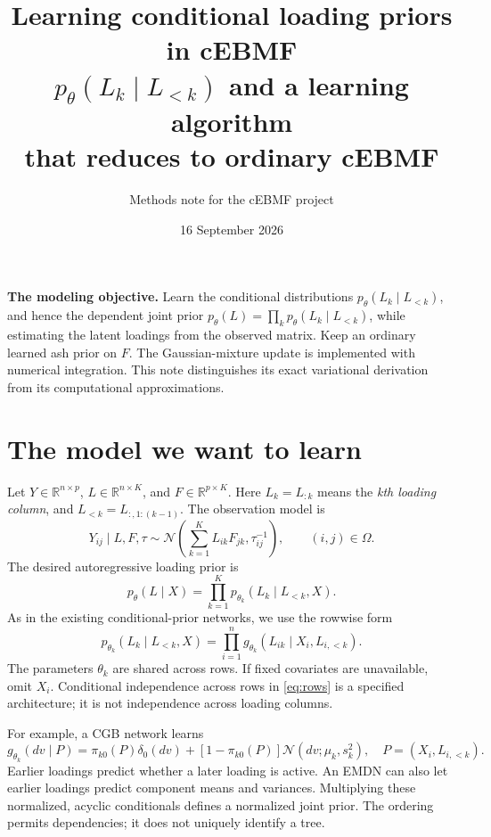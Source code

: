\documentclass[11pt,a4paper]{article}
\title{\textbf{Learning conditional loading priors in cEBMF}\\[7pt]
  \Large $p_\theta(L_k\mid L_{<k})$ and a learning algorithm\\
  that reduces to ordinary cEBMF}
\author{Methods note for the cEBMF project}
\date{16 September 2026}
\newcommand{\N}{\mathcal N}
\newcommand{\note}[1]{\par\smallskip\noindent\colorbox{blue!5}{\parbox{\dimexpr\linewidth-2\fboxsep\relax}{#1}}\par\smallskip}
\begin{document}
\maketitle
\thispagestyle{fancy}

\note{\textbf{The modeling objective.} Learn the conditional distributions
\(p_\theta(L_k\mid L_{<k})\), and hence the dependent joint prior
\(p_\theta(L)=\prod_kp_\theta(L_k\mid L_{<k})\), while estimating the latent
loadings from the observed matrix. Keep an ordinary learned ash prior on
\(F\). The Gaussian-mixture update is implemented with numerical integration.
This note distinguishes its exact variational derivation from its computational approximations.}

\section{The model we want to learn}
Let \(Y\in\mathbb R^{n\times p}\), \(L\in\mathbb R^{n\times K}\), and
\(F\in\mathbb R^{p\times K}\). Here \(L_k=L_{:k}\) means the \emph{kth
loading column}, and \(L_{<k}=L_{:,1:(k-1)}\). The observation model is
\begin{equation}
Y_{ij}\mid L,F,\tau\sim
\N\!\left(\sum_{k=1}^KL_{ik}F_{jk},\tau_{ij}^{-1}\right),
\qquad (i,j)\in\Omega.
\label{eq:likelihood}
\end{equation}
The desired autoregressive loading prior is
\begin{equation}
\boxed{p_\theta(L\mid X)=\prod_{k=1}^Kp_{\theta_k}(L_k\mid L_{<k},X).}
\label{eq:desired}
\end{equation}
As in the existing conditional-prior networks, we use the rowwise form
\begin{equation}
p_{\theta_k}(L_k\mid L_{<k},X)
=\prod_{i=1}^ng_{\theta_k}(L_{ik}\mid X_i,L_{i,<k}).
\label{eq:rows}
\end{equation}
The parameters \(\theta_k\) are shared across rows. If fixed covariates are
unavailable, omit \(X_i\). Conditional independence across rows in
\eqref{eq:rows} is a specified architecture; it is not independence across
loading columns.

For example, a CGB network learns
\[
g_{\theta_k}(dv\mid P)=\pi_{k0}(P)\delta_0(dv)
+[1-\pi_{k0}(P)]\N(dv;\mu_k,s_k^2),\quad P=(X_i,L_{i,<k}).
\]
Earlier loadings predict whether a later loading is active. An EMDN can
also let earlier loadings predict component means and variances. Multiplying
these normalized, acyclic conditionals defines a normalized joint prior.
The ordering permits dependencies; it does not uniquely identify a tree.
\end{document}
